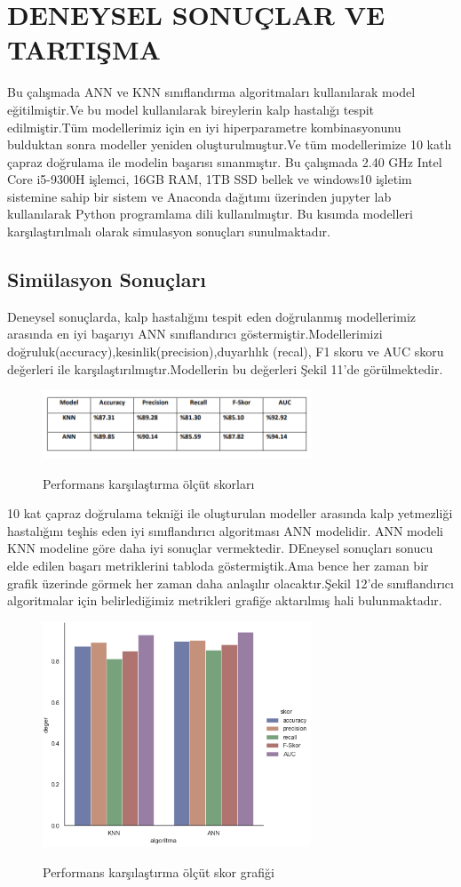 \documentclass[conference]{IEEEtran}
\begin{document}
\section{DENEYSEL SONUÇLAR VE TARTIŞMA}
Bu çalışmada ANN ve KNN sınıflandırma algoritmaları kullanılarak model eğitilmiştir.Ve bu model kullanılarak bireylerin kalp hastalığı tespit edilmiştir.Tüm modellerimiz için en iyi hiperparametre kombinasyonunu bulduktan sonra modeller yeniden oluşturulmuştur.Ve tüm modellerimize 10 katlı çapraz doğrulama ile modelin başarısı sınanmıştır. Bu çalışmada 2.40 GHz Intel Core i5-9300H işlemci, 16GB RAM, 1TB SSD bellek ve windows10 işletim sistemine sahip bir sistem ve Anaconda dağıtımı üzerinden jupyter lab
kullanılarak Python programlama dili kullanılmıştır. Bu kısımda modelleri karşılaştırılmalı olarak simulasyon sonuçları sunulmaktadır.
\subsection{Simülasyon Sonuçları}
Deneysel sonuçlarda, kalp hastalığını tespit eden doğrulanmış modellerimiz arasında en iyi başarıyı ANN sınıflandırıcı göstermiştir.Modellerimizi doğruluk(accuracy),kesinlik(precision),duyarlılık (recal), F1 skoru ve AUC skoru değerleri ile karşılaştırılmıştır.Modellerin bu değerleri Şekil 11'de görülmektedir.
\begin{figure}[htbp]
    \centering
   	\includegraphics[width=8cm]{images/sonuc.PNG}\\
	\caption{Performans karşılaştırma ölçüt skorları}
    \label{fig}
\end{figure}
10 kat çapraz doğrulama tekniği ile oluşturulan modeller arasında kalp yetmezliği hastalığını teşhis eden iyi sınıflandırıcı algoritması ANN modelidir. ANN modeli KNN modeline göre daha iyi sonuçlar vermektedir. 
DEneysel sonuçları sonucu elde edilen başarı metriklerini tabloda göstermiştik.Ama bence her zaman bir grafik üzerinde görmek her zaman daha anlaşılır olacaktır.Şekil 12'de sınıflandırıcı algoritmalar için belirlediğimiz metrikleri grafiğe aktarılmış hali bulunmaktadır.
\begin{figure}[htbp]
    \centering
   	\includegraphics[width=8cm]{images/sonucgrafik.PNG}\\
	\caption{Performans karşılaştırma ölçüt skor grafiği}
    \label{fig}
\end{figure}
\end{document}
